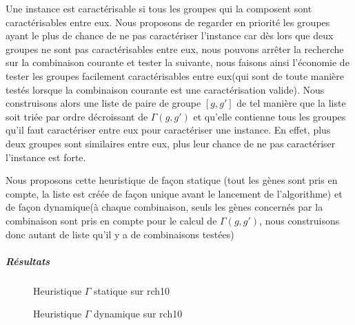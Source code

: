 
Une instance est caractérisable si tous les groupes qui la composent sont caractérisables entre eux. Nous proposons de regarder en priorité les groupes ayant le plus de chance de ne pas caractériser l'instance car dès lors que deux groupes ne sont pas caractérisables entre eux, nous pouvons arrêter la recherche sur la combinaison courante et tester la suivante, nous faisons ainsi l'économie de tester les groupes facilement caractérisables entre eux(qui sont de toute manière testés lorsque la combinaison courante est une caractérisation valide). Nous construisons alors une liste de paire de groupe $[g,g']$ de tel manière que la liste soit triée par ordre décroissant de $\Gamma(g,g')$ et qu'elle contienne tous les groupes qu'il faut caractériser entre eux pour caractériser une instance. En effet, plus deux groupes sont similaires entre eux, plus leur chance de ne pas caractériser l'instance est forte.

Nous proposons cette heuristique de façon statique (tout les gènes sont pris en compte, la liste est créée de façon unique avant le lancement de l'algorithme) et de façon dynamique(à chaque combinaison, seuls les gènes concernés par la combinaison sont pris en compte pour le calcul de $\Gamma(g,g')$, nous construisons donc autant de liste qu'il y a de combinaisons testées)



\subparagraph{Résultats}


\begin{figure}
\centering
	\begin{minipage}[c]{0.49\linewidth}
	\centering
	
	\end{minipage}
	\begin{minipage}[c]{0.49\linewidth}
	\centering
	
	\end{minipage}
\caption{Heuristique $\Gamma$ statique sur rch10}
\label{GammaStatiqueRch10}
\end{figure}

\begin{figure}
\centering
	\begin{minipage}[c]{0.49\linewidth}
	\centering
	
	\end{minipage}
	\begin{minipage}[c]{0.49\linewidth}
	\centering
	
	\end{minipage}
\caption{Heuristique $\Gamma$ dynamique sur rch10}
\label{GammaDynamiqueRch10}
\end{figure}

